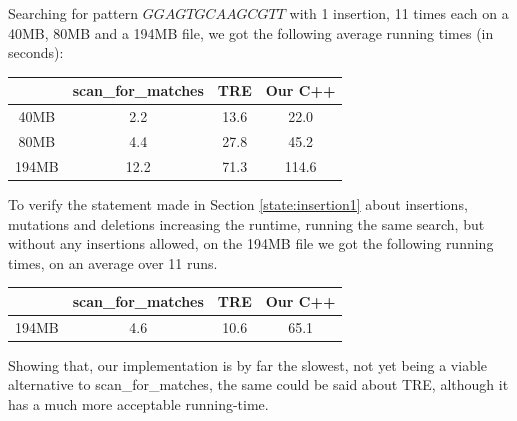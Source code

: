 Searching for pattern $GGAGTGCAAGCGTT$ with 1 insertion, 11 times each on a 40MB, 80MB and a 194MB file, we got the following average running times (in seconds):\\
\begin{tabular}{ c | c | c |  c }
 &scan\_for\_matches & TRE & Our C++ \\
 \hline
 40MB & 2.2 & 13.6 & 22.0 \\
 80MB & 4.4 & 27.8 & 45.2 \\
 194MB & 12.2 &  71.3 &  114.6
\end{tabular}

To verify the statement made in Section \ref{state:insertion1} about insertions, mutations and deletions increasing the runtime, running the same search, but without any insertions allowed, on the 194MB file we got the following running times, on an average over 11 runs.\\
\begin{tabular}{ c | c | c |  c }
 &scan\_for\_matches & TRE & Our C++ \\
 \hline
 194MB & 4.6 &  10.6 &  65.1
\end{tabular}

Showing that, our implementation is by far the slowest, not yet being a viable alternative to scan\_for\_matches, the same could be said about TRE, although it has a much more acceptable running-time.
